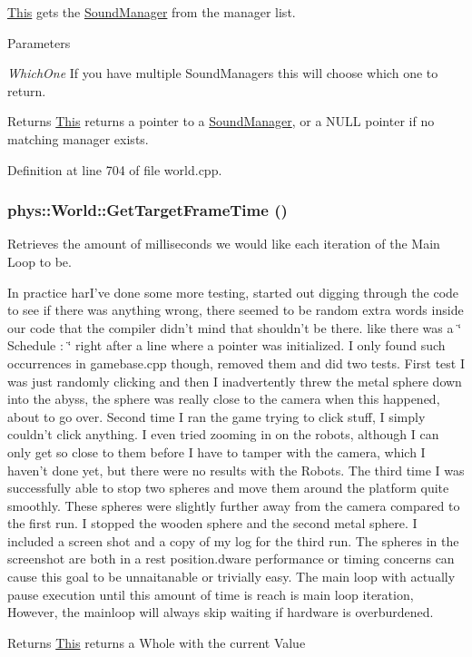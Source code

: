\hyperlink{structThis}{This} gets the \hyperlink{classphys_1_1SoundManager}{SoundManager} from the manager list. 


\begin{DoxyParams}{Parameters}
\item[{\em WhichOne}]If you have multiple SoundManagers this will choose which one to return. \end{DoxyParams}
\begin{DoxyReturn}{Returns}
\hyperlink{structThis}{This} returns a pointer to a \hyperlink{classphys_1_1SoundManager}{SoundManager}, or a NULL pointer if no matching manager exists. 
\end{DoxyReturn}


Definition at line 704 of file world.cpp.

\hypertarget{classphys_1_1World_aa063ace52be484c7b03ec5859453f48b}{
\subsubsection[{GetTargetFrameTime}]{ phys::World::GetTargetFrameTime ()}}
\label{da/ddf/classphys_1_1World_aa063ace52be484c7b03ec5859453f48b}


Retrieves the amount of milliseconds we would like each iteration of the Main Loop to be. 

In practice harI've done some more testing, started out digging through the code to see if there was anything wrong, there seemed to be random extra words inside our code that the compiler didn't mind that shouldn't be there. like there was a \char`\"{} Schedule : \char`\"{} right after a line where a pointer was initialized. I only found such occurrences in gamebase.cpp though, removed them and did two tests. First test I was just randomly clicking and then I inadvertently threw the metal sphere down into the abyss, the sphere was really close to the camera when this happened, about to go over. Second time I ran the game trying to click stuff, I simply couldn't click anything. I even tried zooming in on the robots, although I can only get so close to them before I have to tamper with the camera, which I haven't done yet, but there were no results with the Robots. The third time I was successfully able to stop two spheres and move them around the platform quite smoothly. These spheres were slightly further away from the camera compared to the first run. I stopped the wooden sphere and the second metal sphere. I included a screen shot and a copy of my log for the third run. The spheres in the screenshot are both in a rest position.dware performance or timing concerns can cause this goal to be unnaitanable or trivially easy. The main loop with actually pause execution until this amount of time is reach is main loop iteration, However, the mainloop will always skip waiting if hardware is overburdened. \begin{DoxyReturn}{Returns}
\hyperlink{structThis}{This} returns a Whole with the current Value 
\end{DoxyReturn}


